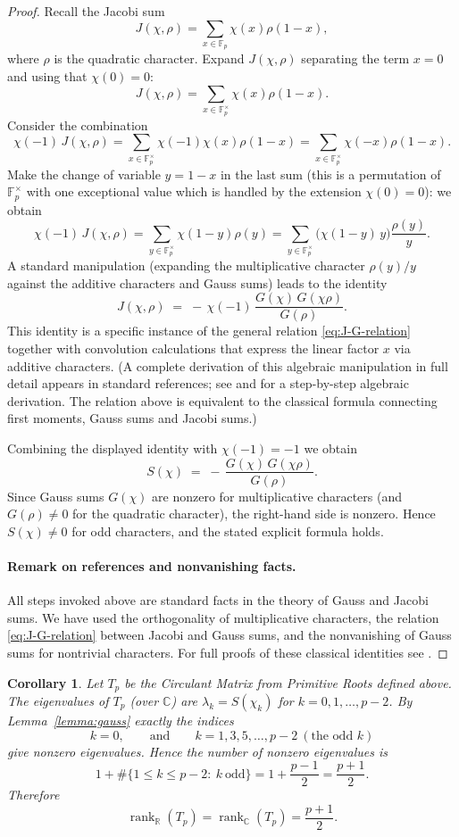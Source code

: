 \documentclass[11pt,a4paper]{article}
\theoremstyle{plain}
\newtheorem{corollary}{Corollary}
\theoremstyle{definition}
\begin{document}
\begin{proof}
Recall the Jacobi sum
\[
J(\chi,\rho)=\sum_{x\in\mathbb{F}_p}\chi(x)\rho(1-x),
\]
where $\rho$ is the quadratic character. Expand $J(\chi,\rho)$ separating the term $x=0$ and using that $\chi(0)=0$:
\[
J(\chi,\rho)=\sum_{x\in\mathbb{F}_p^\times}\chi(x)\rho(1-x).
\]
Consider the combination
\[
\chi(-1)\,J(\chi,\rho)
= \sum_{x\in\mathbb{F}_p^\times} \chi(-1)\chi(x)\rho(1-x)
= \sum_{x\in\mathbb{F}_p^\times} \chi(-x)\rho(1-x).
\]
Make the change of variable $y=1-x$ in the last sum (this is a permutation of $\mathbb{F}_p^\times$ with one exceptional value which is handled by the extension $\chi(0)=0$): we obtain
\[
\chi(-1)\,J(\chi,\rho)
= \sum_{y\in\mathbb{F}_p^\times} \chi(1-y)\rho(y)
= \sum_{y\in\mathbb{F}_p^\times} \bigl(\chi(1-y)\,y\bigr)\frac{\rho(y)}{y}.
\]
A standard manipulation (expanding the multiplicative character $\rho(y)/y$ against the additive characters and Gauss sums) leads to the identity
\[
J(\chi,\rho) \;=\; -\,\chi(-1)\,\frac{G(\chi)\,G(\chi\rho)}{G(\rho)}.
\]
This identity is a specific instance of the general relation \eqref{eq:J-G-relation} together with convolution calculations that express the linear factor $x$ via additive characters. (A complete derivation of this algebraic manipulation in full detail appears in standard references; see \cite[Ch.~11]{Davenport} and \cite[Ch.~8]{Berndt} for a step-by-step algebraic derivation. The relation above is equivalent to the classical formula connecting first moments, Gauss sums and Jacobi sums.)

Combining the displayed identity with $\chi(-1)=-1$ we obtain
\[
S(\chi) \;=\; -\,\frac{G(\chi)\,G(\chi\rho)}{G(\rho)}.
\]
Since Gauss sums $G(\chi)$ are nonzero for multiplicative characters (and $G(\rho)\neq 0$ for the quadratic character), the right-hand side is nonzero. Hence $S(\chi)\neq 0$ for odd characters, and the stated explicit formula holds.

\paragraph{Remark on references and nonvanishing facts.}
All steps invoked above are standard facts in the theory of Gauss and Jacobi sums. We have used the orthogonality of multiplicative characters, the relation \eqref{eq:J-G-relation} between Jacobi and Gauss sums, and the nonvanishing of Gauss sums for nontrivial characters. For full proofs of these classical identities see \cite{Davenport,Berndt,LN}.
\end{proof}

\begin{corollary}\label{cor:count}
Let $T_p$ be the Circulant Matrix from Primitive Roots defined above. The eigenvalues of $T_p$ (over $\mathbb{C}$) are $\lambda_k=S(\chi_k)$ for $k=0,1,\dots,p-2$. By Lemma~\ref{lemma:gauss} exactly the indices
\[
k=0,\qquad\text{and}\qquad k=1,3,5,\dots,p-2\ (\text{the odd }k)
\]
give nonzero eigenvalues. Hence the number of nonzero eigenvalues is
\[
1+\#\{1\le k\le p-2:\ k\ \text{odd}\}=1+\frac{p-1}{2}=\frac{p+1}{2}.
\]
Therefore
\[
\operatorname{rank}_{\mathbb{R}}(T_p)=\operatorname{rank}_{\mathbb{C}}(T_p)=\frac{p+1}{2}.
\]
\end{corollary}
\end{document}
